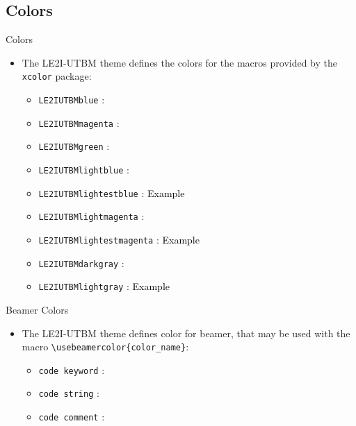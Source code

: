 \documentclass[english,sectioncirclenumberstyle]{le2iutbmbeamer}
\begin{document}
\subsection{Colors}

\begin{frame}{Colors}
	\begin{itemize}
	\item The LE2I-UTBM theme defines the colors for the macros provided by the \texttt{xcolor} package:
		\begin{itemize}
		\item \texttt{LE2IUTBMblue} : \fbox{\textcolor{LE2IUTBMblue}{Example}} \colorbox{LE2IUTBMblue}{\textcolor{white}{Example}}
		\vfill
		\item \texttt{LE2IUTBMmagenta} : \fbox{\textcolor{LE2IUTBMmagenta}{Example}} \colorbox{LE2IUTBMmagenta}{\textcolor{white}{Example}}
		\vfill
		\item \texttt{LE2IUTBMgreen} : \fbox{\textcolor{LE2IUTBMgreen}{Example}} \colorbox{LE2IUTBMgreen}{\textcolor{white}{Example}}
		\vfill
		\item \texttt{LE2IUTBMlightblue} : \fbox{\textcolor{LE2IUTBMlightblue}{Example}} \colorbox{LE2IUTBMlightblue}{\textcolor{white}{Example}}
		\vfill
		\item \texttt{LE2IUTBMlightestblue} : \fbox{\textcolor{LE2IUTBMlightestblue}{Example}} \colorbox{LE2IUTBMlightestblue}{\textcolor{black}{Example}}
		\vfill
		\item \texttt{LE2IUTBMlightmagenta} : \fbox{\textcolor{LE2IUTBMlightmagenta}{Example}} \colorbox{LE2IUTBMlightmagenta}{\textcolor{white}{Example}}
		\vfill
		\item \texttt{LE2IUTBMlightestmagenta} : \fbox{\textcolor{LE2IUTBMlightestmagenta}{Example}} \colorbox{LE2IUTBMlightestmagenta}{\textcolor{black}{Example}}
		\vfill
		\item \texttt{LE2IUTBMdarkgray} : \fbox{\textcolor{LE2IUTBMdarkgray}{Example}} \colorbox{LE2IUTBMdarkgray}{\textcolor{white}{Example}}
		\vfill
		\item \texttt{LE2IUTBMlightgray} : \fbox{\textcolor{LE2IUTBMlightgray}{Example}} \colorbox{LE2IUTBMlightgray}{\textcolor{black}{Example}}
		\end{itemize}
	\end{itemize}
\end{frame}

\begin{frame}{Beamer Colors}
	\begin{itemize}
	\item The LE2I-UTBM theme defines color for beamer, that may be used with the macro \texttt{{\textbackslash}usebeamercolor\{color\_name\}}:
		\begin{itemize}
		\item \texttt{code keyword} : 
		\vfill
		\item \texttt{code string} : 
		\vfill
		\item \texttt{code comment} : 
		\end{itemize}
	\end{itemize}
\end{frame}
\end{document}
